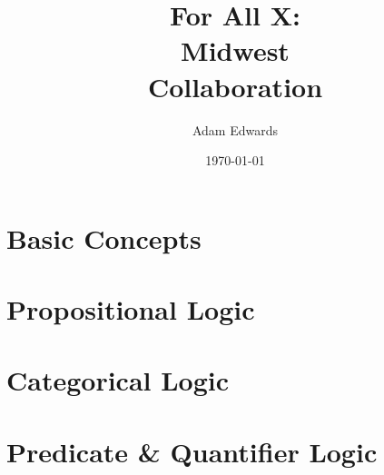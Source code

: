 \documentclass[nobib]{tufte-book}
\title{For All X: \\ Midwest \\ Collaboration}
\author[Adam Edwards]{Adam Edwards}
\date{\today}
\begin{document}

\frontmatter

\pagestyle{empty}
\setlength{\parindent}{0pt}
\setlength{\parskip}{\baselineskip}


\maketitle




\setlength{\parskip}{0em}

\begin{fullwidth}
\tableofcontents
\end{fullwidth}






\mainmatter

\label{full_version}
\listoffigures
\newpage
\listoftables

\part{Basic Concepts}\label{part:basic_concepts}




\part{Propositional Logic}\label{part:prop_logic}



%

\part{Categorical Logic}\label{part:cat_logic}


%
%
%

\part{Predicate \& Quantifier Logic}\label{part:pred_logic}



%
%
\end{document}
